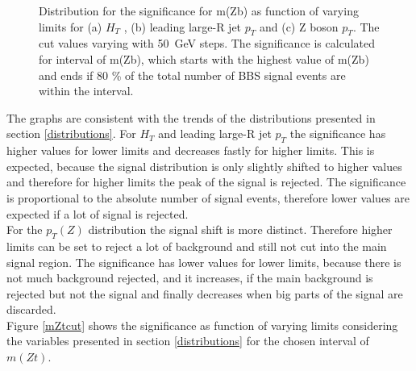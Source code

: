 \begin{figure}[h]
    \centering
    \centering
    \centering
    \caption{Distribution for the significance for m(Zb) as function of varying limits for (a) $H_{T}$ , (b) leading large-R jet $p_{T}$ and (c) Z boson $p_{T}$.
    The cut values varying with \SI{50}{GeV} steps.
    The significance is calculated for interval of m(Zb), which starts with the highest value of m(Zb) and ends if 80 \% of the total number of BBS signal events are within the interval.}
    \label{mZbcut}   
\end{figure}
    

The graphs are consistent with the trends of the distributions presented in section \ref{distributions}.
For $H_{T}$ and leading large-R jet $p_{T}$ the significance has higher values for lower limits and decreases fastly for higher limits.
This is expected, because the signal distribution is only slightly shifted to higher values and therefore for higher limits the peak of the signal is rejected.
The significance is proportional to the absolute number of signal events, therefore lower values are expected if a lot of signal is rejected.\\
For the $p_{T}(Z)$ distribution the signal shift is more distinct.
Therefore higher limits can be set to reject a lot of background and still not cut into the main signal region.
The significance has lower values for lower limits, because there is not much background rejected, and it increases, if the main background is rejected but not the signal and finally decreases when big parts of the signal are discarded.\\
Figure \ref{mZtcut} shows the significance as function of varying limits considering the variables presented in section \ref{distributions} for the chosen interval of $m(Zt)$.


